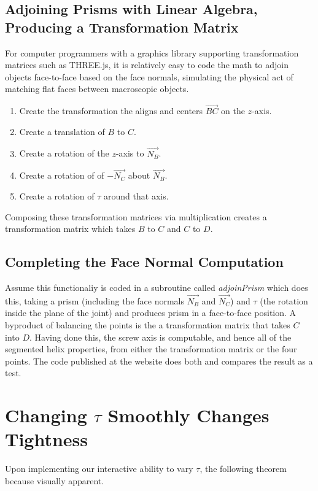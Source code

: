 \documentclass[11pt]{article}
\begin{document}
{\subsection{Adjoining Prisms with Linear Algebra, Producing a Transformation Matrix}
\label{sec:adjoin}

For computer programmers with a graphics library supporting transformation matrices such
as THREE.js\cite{dirksen2013learning},
it is relatively easy to code the math to adjoin objects
face-to-face based on the face normals, simulating the physical act of
matching flat faces between macroscopic objects.
\begin{enumerate}
  \item Create the transformation the aligns and centers $\overrightarrow{BC}$ on the $z$-axis.
\item Create a translation of $B$ to $C$.
\item Create a rotation of the $z$-axis to  $\overrightarrow{N_B}$.
\item Create a rotation of of $-\overrightarrow{N_C}$ about $\overrightarrow{N_B}$.
  \item Create a rotation of $\tau$ around that axis.
\end{enumerate}
Composing these transformation matrices via multiplication creates a
transformation matrix which takes $B$ to $C$ and $C$ to $D$.

\subsection{Completing the Face Normal Computation}
Assume this functionaliy
is coded in a subroutine called {\em adjoinPrism} which does this, taking a prism
(including the face normals $\overrightarrow{N_B}$ and $\overrightarrow{N_C}$) and $\tau$
(the rotation inside the plane of the joint) and produces prism
in a face-to-face position. A byproduct
of balancing the points is the a transformation matrix
that takes $C$ into $D$. Having done this, the screw axis is computable,
and hence all of the segmented helix properties,
from either the transformation matrix or the four points.
The code published at the website does both and compares the result as a test.

\section{Changing $\tau$ Smoothly Changes Tightness}

Upon implementing our interactive ability to vary $\tau$, the following
theorem because visually apparent.

}
\end{document}
